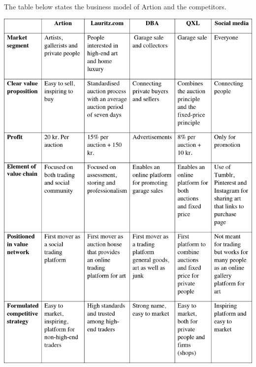 The table below states the business model of Artion and the competitors. 

\begin{center}
\includegraphics[width=15cm]{Appendix/BusinessModels.png}
\end{center}